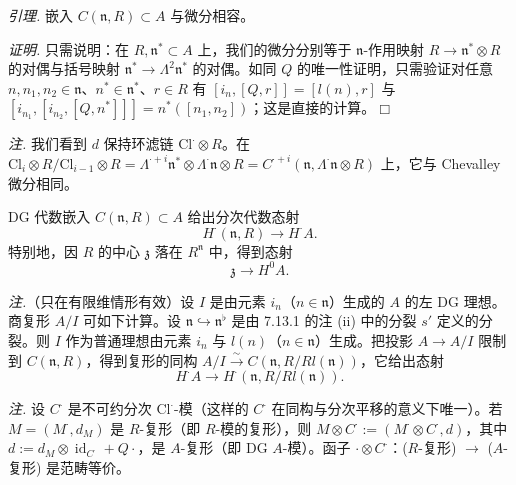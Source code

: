  \emph{引理.} 嵌入 $C(\mathfrak{n},R)\subset A$ 与微分相容。

\emph{证明.} 只需说明：在 $R,\mathfrak{n}^{*}\subset A$ 上，我们的微分分别等于 $\mathfrak{n}$-作用映射 $R\to\mathfrak{n}^{*}\otimes R$ 的对偶与括号映射 $\mathfrak{n}^{*}\to\Lambda^{2}\mathfrak{n}^{*}$ 的对偶。如同 $Q$ 的唯一性证明，只需验证对任意 $n,n_1,n_2\in\mathfrak{n}$、$n^{*}\in\mathfrak{n}^{*}$、$r\in R$ 有 $[i_n,[Q,r]]=[l(n),r]$ 与 $[i_{n_1},[i_{n_2},[Q,n^{*}]]]=n^{*}([n_1,n_2])$；这是直接的计算。\hfill$\Box$

\emph{注.} 我们看到 $d$ 保持环滤链 $\mathrm{Cl}^{\cdot}\otimes R$。在 $\mathrm{Cl}_i\otimes R/\mathrm{Cl}_{i-1}\otimes R=\Lambda^{\cdot+i}\mathfrak{n}^{*}\otimes\Lambda^{\cdot}\mathfrak{n}\otimes R=C^{\cdot+i}(\mathfrak{n},\Lambda^{\cdot}\mathfrak{n}\otimes R)$ 上，它与 Chevalley 微分相同。


DG 代数嵌入 $C(\mathfrak{n},R)\subset A$ 给出分次代数态射
\begin{equation}\tag{367}
H^{\cdot}(\mathfrak{n},R)\to H^{\cdot}A.
\end{equation}
特别地，因 $R$ 的中心 $\mathfrak{z}$ 落在 $R^{\mathfrak{n}}$ 中，得到态射
\begin{equation}\tag{368}
\mathfrak{z}\to H^{0}A.
\end{equation}

 \emph{注.}（只在有限维情形有效）设 $I$ 是由元素 $i_n$（$n\in\mathfrak{n}$）生成的 $A$ 的左 DG 理想。商复形 $A/I$ 可如下计算。设 $\mathfrak{n}\hookrightarrow\mathfrak{n}^{\flat}$ 是由 7.13.1 的注 (ii) 中的分裂 $s'$ 定义的分裂。则 $I$ 作为普通理想由元素 $i_n$ 与 $l(n)$（$n\in\mathfrak{n}$）生成。把投影 $A\to A/I$ 限制到 $C(\mathfrak{n},R)$，得到复形的同构 $A/I\xrightarrow{\sim}C(\mathfrak{n},R/Rl(\mathfrak{n}))$，它给出态射
\begin{equation}\tag{369}
H^{\cdot}A\to H^{\cdot}(\mathfrak{n},R/Rl(\mathfrak{n})).
\end{equation}

 \emph{注.} 设 $C^{\cdot}$ 是不可约分次 $\mathrm{Cl}^{\cdot}$-模（这样的 $C^{\cdot}$ 在同构与分次平移的意义下唯一）。若 $M=(M^{\cdot},d_M)$ 是 $R$-复形（即 $R$-模的复形），则 $M\otimes C^{\cdot}:=(M^{\cdot}\otimes C^{\cdot},d)$，其中 $d:=d_M\otimes\operatorname{id}_{C^{\cdot}}+Q\cdot$，是 $A$-复形（即 DG $A$-模）。函子 $\cdot\otimes C^{\cdot}$：($R$-复形) $\to$ ($A$-复形) 是范畴等价。

